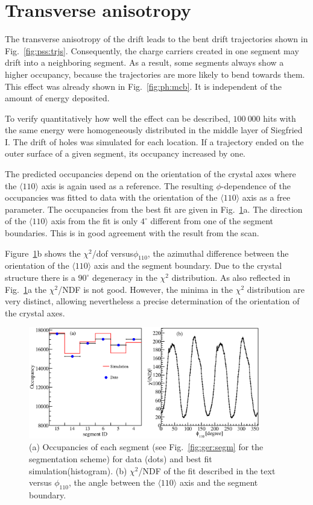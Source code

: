 \section{Transverse anisotropy}
\label{sec:psa:tra}
The transverse anisotropy of the drift leads to the bent drift trajectories shown in Fig.~\ref{fig:pss:trjs}. Consequently, the charge carriers created in one segment may drift into a neighboring segment. As a result, some segments always show a higher occupancy, because the trajectories are more likely to bend towards them. This effect was already shown in Fig.~\ref{fig:ph:mcb}. It is independent of the amount of energy deposited.

To verify quantitatively how well the effect can be described, $100\ 000$ hits with the same energy were homogeneously distributed in the middle 
layer of Siegfried I. The drift of holes was simulated for each location. If a trajectory ended on the outer surface of a given segment, its occupancy increased by one.

The predicted occupancies depend on the orientation of the crystal 
axes where the $\langle 110 \rangle$ axis is 
again used  as a reference. 
The resulting $\phi$-dependence of the occupancies 
was fitted to data with the orientation of the  $\langle 110 \rangle$ 
axis as a free parameter. The occupancies 
from the best fit are given 
in Fig.~\ref{fig:psa:focc}a. 
The direction of the $\langle 110 \rangle$ axis from 
the fit is only $4^\circ$ different from one of 
the segment boundaries. This is in good agreement 
with the result from the scan.

Figure~\ref{fig:psa:focc}b shows the $\chi^2$/dof versus$\phi_{110}$, 
the azimuthal difference between 
the orientation of the $\langle 110 \rangle$ axis and the segment boundary. 
Due to the crystal structure there is a $90^{\circ}$ degeneracy
in the $\chi^2$ distribution.  
As also reflected in Fig.~\ref{fig:psa:focc}a the $\chi^2$/NDF is not good. 
However, the minima in the $\chi^2$ distribution are very distinct,
allowing nevertheless a precise determination 
of the orientation of the crystal axes.

\begin{figure}[htbp]
\centering
\includegraphics[width=0.9\textwidth]{fitocc}
\caption{(a) Occupancies of each segment (see Fig.~\ref{fig:ger:segm} for the segmentation scheme) for data (dots) and best fit simulation(histogram). (b) $\chi^{2}$/NDF of the fit described in the text versus $\phi_{110}$, the angle between the $\langle 110 \rangle$ axis and the segment boundary.}
\label{fig:psa:focc}
\end{figure}

